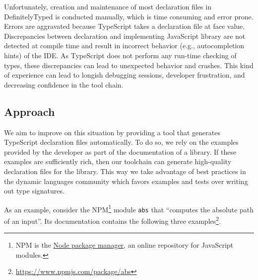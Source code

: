 \documentclass[sigconf]{acmart}
\begin{document}
Unfortunately, creation and maintenance of most declaration
files in DefinitelyTyped is conducted manually,
which is time consuming and  error prone. Errors are aggravated because TypeScript takes a
declaration file at face value. Discrepancies between declaration and
implementing JavaScript library are not detected at 
compile time and result in incorrect behavior (e.g., autocompletion
hints) of the IDE. 
As TypeScript does not perform any run-time 
checking of types, these  discrepancies can lead to unexpected 
behavior and crashes. This kind of experience can lead to longish debugging sessions,  developer
frustration, and decreasing confidence in the tool chain.

\subsection{Approach}
\label{sec:approach}

We aim to improve on this situation by providing a tool that generates
TypeScript declaration files automatically. To do so, we rely on the examples provided
by the developer as part of the documentation of a library. If these
examples are sufficiently rich, then our toolchain can generate
high-quality declaration files for the library. This way we take
advantage of 
best practices in the dynamic languages community which favors
examples and tests over writing out type signatures.

As an example, consider the NPM\footnote{NPM is the \href{https://www.npmjs.com/}{Node package
  manager}, an online repository for JavaScript modules.} module
\texttt{abs} that
``computes the absolute path of an input''. Its documentation contains
the following three
examples\footnote{\url{https://www.npmjs.com/package/abs}}. 
\end{document}
